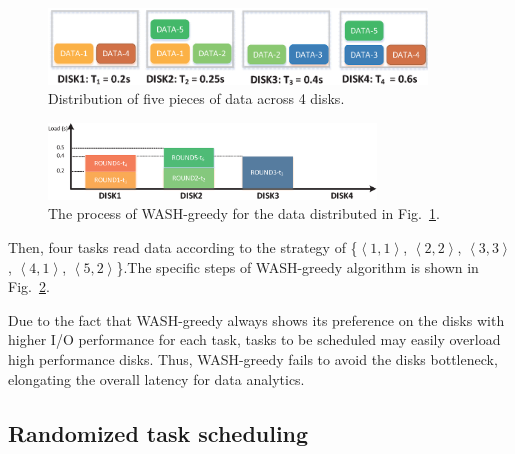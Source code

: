 \documentclass[conference]{IEEEtran}
\begin{document}
\begin{figure}[!t]
	\centering
	\includegraphics[height=0.8in]{fig1_10.eps}
	\vspace{-0.5cm}
	\caption{Distribution of five pieces of data across 4 disks.  }
	\label{fig1}
	\vspace{-0.4cm}
\end{figure}
\begin{figure}[!t]
	\centering
	\includegraphics[height=0.8in]{fig2_4.eps}
	\vspace{-0.2cm}
	\caption{The process of WASH-greedy for the data distributed in Fig.~\ref{fig1}. }
	\label{fig2}
	\vspace{-0.6cm}
\end{figure}

Then, four tasks read data according to the strategy of \{$\left \langle 1, 1\right \rangle$, $\left \langle 2, 2\right \rangle$,  $\left \langle 3, 3\right \rangle$, $\left \langle 4, 1\right \rangle$, $\left \langle 5, 2\right \rangle$\}.The specific steps of WASH-greedy algorithm is shown in Fig.~\ref{fig2}.

Due to the fact that WASH-greedy always shows its preference on the disks with higher I/O performance for each task, tasks to be scheduled may easily overload high performance disks. Thus, WASH-greedy fails to avoid the disks bottleneck, elongating the overall latency for data analytics.

\subsection{Randomized task scheduling}\label{Randomized}

\end{document}
